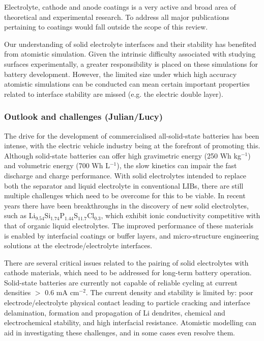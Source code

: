 \documentclass[../main.tex]{subfiles}
\begin{document}
Electrolyte, cathode and anode coatings is a very active and broad area of theoretical and experimental research. To address all major publications pertaining to coatings would fall outside the scope of this review. 

Our understanding of solid electrolyte interfaces and their stability has benefited from atomistic simulation. Given the intrinsic difficulty associated with studying surfaces experimentally, a greater responsibility is placed on these simulations for battery development. However, the limited size under which high accuracy atomistic simulations can be conducted can mean certain important properties related to interface stability are missed (e.g. the electric double layer\cite{Tateyama2019}).

\subsubsection{Outlook and challenges (Julian/Lucy)}
\label{sec:outlook_electrolytes}

The drive for the development of commercialised all-solid-state batteries has been intense, with the electric vehicle industry being at the forefront of promoting this.\cite{Woods_2021} Although solid-state batteries can offer high gravimetric energy (250 Wh kg$^{-1}$) and volumetric energy (700 Wh L$^{-1}$), the slow kinetics can impair the fast discharge and charge performance. With solid electrolytes intended to replace both the separator and liquid electrolyte in conventional LIBs, \cite{schnell2020solid} there are still multiple challenges which need to be overcome for this to be viable. In recent years there have been breakthroughs in the discovery of new solid electrolytes, such as Li$_{9.54}$Si$_{1.74}$P$_{1.44}$S$_{11.7}$Cl$_{0.3}$, \cite{kato2016high} which exhibit ionic conductivity competitive with that of organic liquid electrolytes. The improved performance of these materials is enabled by interfacial coatings or buffer layers, and micro-structure engineering solutions at the electrode/electrolyte interfaces.  \cite{kim2021solid}

There are several critical issues related to the pairing of solid electrolytes with cathode materials, which need to be addressed for long-term battery operation. Solid-state batteries are currently not capable of reliable cycling at current densities $>$ 0.6 mA cm$^{-2}$\cite{famprikis_fundamentals_2019, Albertus2018}. The current density and stability is limited by: poor electrode/electrolyte physical contact leading to particle cracking and interface delamination, formation and propagation of Li dendrites, chemical and electrochemical stability, and high interfacial resistance. \cite{famprikis_fundamentals_2019} Atomistic modelling can aid in investigating these challenges, and in some cases even resolve them.
\end{document}
